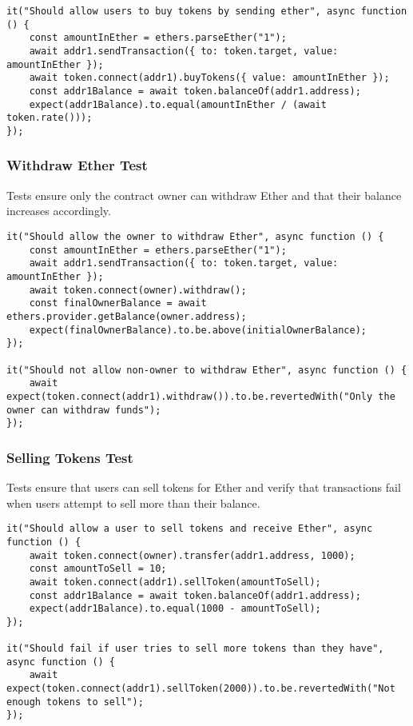 \documentclass[../main.tex]{subfiles}
\begin{document}
\begin{verbatim}
it("Should allow users to buy tokens by sending ether", async function () {
    const amountInEther = ethers.parseEther("1");
    await addr1.sendTransaction({ to: token.target, value: amountInEther });
    await token.connect(addr1).buyTokens({ value: amountInEther });
    const addr1Balance = await token.balanceOf(addr1.address);
    expect(addr1Balance).to.equal(amountInEther / (await token.rate()));
});
\end{verbatim}

\subsubsection{Withdraw Ether Test}
Tests ensure only the contract owner can withdraw Ether and that their balance increases accordingly.

\begin{verbatim}
it("Should allow the owner to withdraw Ether", async function () {
    const amountInEther = ethers.parseEther("1");
    await addr1.sendTransaction({ to: token.target, value: amountInEther });
    await token.connect(owner).withdraw();
    const finalOwnerBalance = await ethers.provider.getBalance(owner.address);
    expect(finalOwnerBalance).to.be.above(initialOwnerBalance);
});

it("Should not allow non-owner to withdraw Ether", async function () {
    await expect(token.connect(addr1).withdraw()).to.be.revertedWith("Only the owner can withdraw funds");
});
\end{verbatim}

\subsubsection{Selling Tokens Test}
Tests ensure that users can sell tokens for Ether and verify that transactions fail when users attempt to sell more than their balance.

\begin{verbatim}
it("Should allow a user to sell tokens and receive Ether", async function () {
    await token.connect(owner).transfer(addr1.address, 1000);
    const amountToSell = 10;
    await token.connect(addr1).sellToken(amountToSell);
    const addr1Balance = await token.balanceOf(addr1.address);
    expect(addr1Balance).to.equal(1000 - amountToSell);
});

it("Should fail if user tries to sell more tokens than they have", async function () {
    await expect(token.connect(addr1).sellToken(2000)).to.be.revertedWith("Not enough tokens to sell");
});
\end{verbatim}
\end{document}
